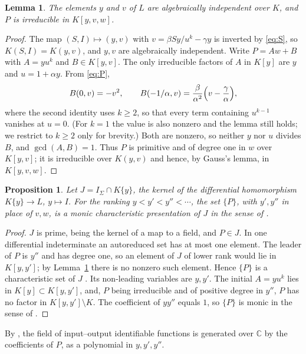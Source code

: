 \documentclass[10pt,a4paper]{article}
\newtheorem{lemma}[theorem]{Lemma}
\newtheorem{proposition}[theorem]{Proposition}
\theoremstyle{definition}
\theoremstyle{remark}
\newcommand{\C}{\mathbb C}
\begin{document}
\begin{lemma}
\label{lem:irr}
The elements $y$ and $v$ of $L$ are algebraically independent over $K$,
and $P$ is irreducible in $K[y,v,w]$.
\end{lemma}

\begin{proof}
The map $(S,I)\mapsto(y,v)$ with $v=\beta Sy/u^k-\gamma y$ is inverted by
\eqref{eq:S}, so $K(S,I)=K(y,v)$, and $y,v$ are algebraically independent.
Write $P=Aw+B$ with $A=yu^k$ and $B\in K[y,v]$. The only irreducible
factors of $A$ in $K[y]$ are $y$ and $u=1+\alpha y$. From \eqref{eq:P},
\[
 B(0,v)=-v^2,\qquad
 B(-1/\alpha,v)=\frac{\beta}{\alpha^2}\Bigl(v-\frac{\gamma}{\alpha}\Bigr),
\]
where the second identity uses $k\geq2$, so that every term containing
$u^{k-1}$ vanishes at $u=0$. (For $k=1$ the value is also nonzero and the
lemma still holds; we restrict to $k\geq2$ only for brevity.) Both are nonzero, so neither $y$ nor $u$
divides $B$, and $\gcd(A,B)=1$. Thus $P$ is primitive and of degree one
in $w$ over $K[y,v]$; it is irreducible over $K(y,v)$ and hence, by Gauss's
lemma, in $K[y,v,w]$.
\end{proof}

\begin{proposition}
\label{prop:charpres}
Let $J=I_\Sigma\cap K\{y\}$, the kernel of the differential homomorphism
$K\{y\}\to L$, $y\mapsto I$. For the ranking $y<y'<y''<\cdots$, the set
$\{P\}$, with $y',y''$ in place of $v,w$, is a monic characteristic
presentation of $J$ in the sense of \cite[Definition~5.4]{OPT}.
\end{proposition}

\begin{proof}
$J$ is prime, being the kernel of a map to a field, and $P\in J$. In one
differential indeterminate an autoreduced set has at most one element.
The leader of $P$ is $y''$ and has degree one, so an element of $J$ of
lower rank would lie in $K[y,y']$; by Lemma~\ref{lem:irr} there is no
nonzero such element. Hence $\{P\}$ is a characteristic set of $J$
\cite[Definition~5.3]{OPT}. Its non-leading variables are $y,y'$. The
initial $A=yu^k$ lies in $K[y]\subset K[y,y']$, and, $P$ being irreducible
and of positive degree in $y''$, $P$ has no factor in $K[y,y']\setminus K$.
The coefficient of $yy''$ equals $1$, so $\{P\}$ is monic in the sense of
\cite[Definition~5.4]{OPT}.
\end{proof}

By \cite[Corollary~5.7]{OPT}, the field of input--output identifiable
functions is generated over $\C$ by the coefficients of $P$, as a
polynomial in $y,y',y''$.
\end{document}
